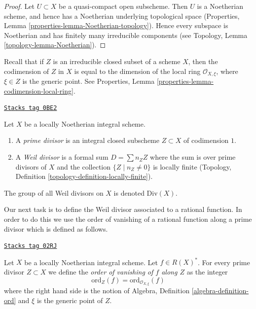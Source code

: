 \begin{proof}
Let $U \subset X$ be a quasi-compact open subscheme. Then $U$ is a Noetherian
scheme, and hence has a Noetherian underlying topological space
(Properties, Lemma \ref{properties-lemma-Noetherian-topology}).
Hence every subspace is Noetherian and
has finitely many irreducible components
(see Topology, Lemma \ref{topology-lemma-Noetherian}).
\end{proof}

Recall that if $Z$ is an irreducible closed subset of a scheme $X$,
then the codimension of $Z$ in $X$ is equal to the dimension
of the local ring $\mathcal{O}_{X, \xi}$, where $\xi \in Z$
is the generic point. See
Properties, Lemma \ref{properties-lemma-codimension-local-ring}.

\begin{definition}
\label{divisors-definition-Weil-divisor}
\href{https://stacks.math.columbia.edu/tag/0BE2}{\texttt{Stacks tag 0BE2}}

Let $X$ be a locally Noetherian integral scheme.
\begin{enumerate}
\item A {\it prime divisor} is an integral closed subscheme $Z \subset X$
of codimension $1$.
\item A {\it Weil divisor} is a formal sum $D = \sum n_Z Z$ where
the sum is over prime divisors of $X$ and the collection
$\{Z \mid n_Z \not = 0\}$ is locally finite
(Topology, Definition \ref{topology-definition-locally-finite}).
\end{enumerate}
The group of all Weil divisors on $X$ is denoted $\text{Div}(X)$.
\end{definition}

Our next task is to define the Weil divisor associated to a rational
function. In order to do this we use the order of vanishing of a
rational function along a prime divisor which is defined as follows.

\begin{definition}
\label{divisors-definition-order-vanishing}
\href{https://stacks.math.columbia.edu/tag/02RJ}{\texttt{Stacks tag 02RJ}}

Let $X$ be a locally Noetherian integral scheme. Let $f \in R(X)^*$.
For every prime divisor $Z \subset X$ we define the
{\it order of vanishing of $f$ along $Z$} as the integer
$$
\text{ord}_Z(f) = \text{ord}_{\mathcal{O}_{X, \xi}}(f)
$$
where the right hand side is the notion of
Algebra, Definition \ref{algebra-definition-ord}
and $\xi$ is the generic point of $Z$.
\end{definition}


